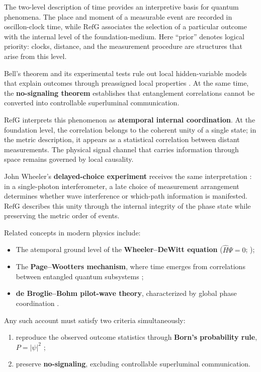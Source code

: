 \documentclass[11pt,a4paper]{article}
\newcommand{\RefG}{\mathrm{RefG}}
\begin{document}
The two-level description of time provides an interpretive basis for quantum phenomena. The place and moment of a measurable event are recorded in oscillon-clock time, while $\RefG$ associates the selection of a particular outcome with the internal level of the foundation-medium. Here ``prior'' denotes logical priority: clocks, distance, and the measurement procedure are structures that arise from this level.

Bell's theorem and its experimental tests rule out local hidden-variable models that explain outcomes through preassigned local properties \citep{bell1964,hensen2015}. At the same time, the \textbf{no-signaling theorem} establishes that entanglement correlations cannot be converted into controllable superluminal communication.

$\RefG$ interprets this phenomenon as \textbf{atemporal internal coordination}. At the foundation level, the correlation belongs to the coherent unity of a single state; in the metric description, it appears as a statistical correlation between distant measurements. The physical signal channel that carries information through space remains governed by local causality.

John Wheeler's \textbf{delayed-choice experiment} receives the same interpretation \citep{wheeler1978,jacques2007}: in a single-photon interferometer, a late choice of measurement arrangement determines whether wave interference or which-path information is manifested. $\RefG$ describes this unity through the internal integrity of the phase state while preserving the metric order of events.

Related concepts in modern physics include:
\begin{itemize}
\item The atemporal ground level of the \textbf{Wheeler--DeWitt equation} ($\hat{H}\Psi = 0$; \citealt{dewitt1967});
\item The \textbf{Page--Wootters mechanism}, where time emerges from correlations between entangled quantum subsystems \citep{pagewootters1983};
\item \textbf{de Broglie--Bohm pilot-wave theory}, characterized by global phase coordination \citep{bohm1952}.
\end{itemize}

Any such account must satisfy two criteria simultaneously:
\begin{enumerate}[label=\arabic*.]
\item reproduce the observed outcome statistics through \textbf{Born's probability rule}, $P=|\psi|^2$ \citep{born1926};
\item preserve \textbf{no-signaling}, excluding controllable superluminal communication.
\end{enumerate}
\end{document}
